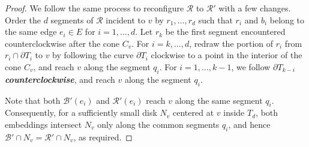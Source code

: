 \documentclass[a4paper,USenglish,cleveref,colorlinks=true,urlcolor=black,linkcolor=black,citecolor=black,thm-restate,authorcolumns]{lipics-v2021}
\theoremstyle{claimstyle}
\def\defn#1{\textit{\textbf{\boldmath #1}}}
\renewcommand{\emph}[1]{\defn{#1}}
\begin{document}
\begin{proof}
    We follow the same process to reconfigure $\mathcal{R}$ to $\mathcal{R}'$ with a few changes. Order the $d$ segments of $\mathcal{R}$ incident to $v$ by $r_1,\ldots , r_d$
    such that $r_i$ and $b_i$ belong to the same edge $e_i\in E$ for $i=1,\ldots , d$.
    Let $r_k$ be the first segment encountered counterclockwise after the cone $C_v$.
    For $i=k,\ldots,d$, redraw the portion of $r_i$ from $r_i\cap\partial T_i$ to $v$ by following the curve $\partial T_i$ clockwise to a point in the interior of the cone $C_v$, and reach $v$ along the segment $q_i$. For $i=1,\ldots,k-1$, we follow $\partial T_{k-i}$ \emph{counterclockwise}, and reach $v$ along the segment $q_i$.

    Note that both $\mathcal{B}'(e_i)$ and $\mathcal{R}'(e_i)$ reach $v$ along the same segment $q_i$.
    Consequently, for a sufficiently small disk $N_v$ centered at $v$ inside $T_d$, both embeddings intersect $N_v$ only along the common segments $q_i$, and hence $\mathcal{B}'\cap N_v= \mathcal{R}'\cap N_v$, as required.
\end{proof}
\end{document}
